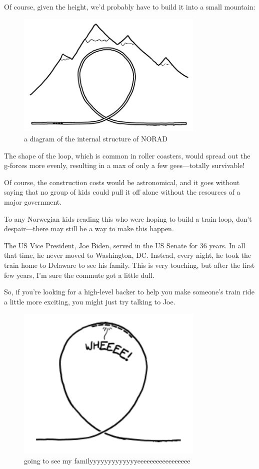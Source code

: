 {{Of course, given the height, we’d probably have to build it into a small mountain:}

\begin{figure}[!htbp]
\centering
\includegraphics[scale=0.5, max width=0.8\textwidth]{imgs/a/43/train_loop_mountain.png}
\caption{a diagram of the internal structure of NORAD}
\end{figure}

{The shape of the loop, which is common in roller coasters, would spread out the g-forces more evenly, resulting in a max of only a few gees—totally survivable!}

{Of course, the construction costs would be astronomical, and it goes without saying that no group of kids could pull it off alone without the resources of a major government.}

{To any Norwegian kids reading this who were hoping to build a train loop, don't despair—there may still be a way to make this happen.}

{The US Vice President, Joe Biden, served in the US Senate for 36 years. In all that time, he never moved to Washington, DC. Instead, every night, he took the train home to Delaware to see his family. This is very touching, but after the first few years, I'm sure the commute got a little dull.}

{So, if you’re looking for a high-level backer to help you make someone’s train ride a little more exciting, you might just try talking to Joe.}

\begin{figure}[!htbp]
\centering
\includegraphics[scale=0.5, max width=0.8\textwidth]{imgs/a/43/train_loop_biden.png}
\caption{going to see my familyyyyyyyyyyyyyeeeeeeeeeeeeeeeee}
\end{figure}

}
